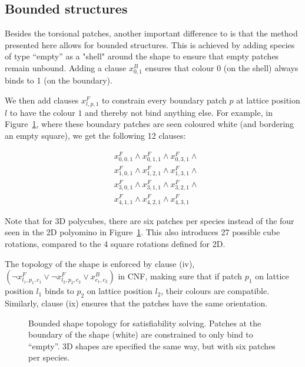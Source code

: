 \subsection{Bounded structures}
Besides the torsional patches, another important difference to \cite{romano2020designing} is that the method presented here allows for bounded structures. This is achieved by adding species of type ``empty'' as a "shell" around the shape to ensure that empty patches remain unbound. Adding a clause \(x_{0,1}^{B}\) ensures that colour 0 (on the shell) always binds to 1 (on the boundary). 

We then add clauses \(x_{l,p,1}^{F}\) to constrain every boundary patch \(p\) at lattice position \(l\) to have the colour \(1\) and thereby not bind anything else. For example, in Figure~\ref{fig:sat_boundary}, where these boundary patches are seen coloured white (and bordering an empty square), we get the following 12 clauses:

\begin{equation}
    \begin{aligned}
        &x_{0,0,1}^{F} \land x_{0,1,1}^{F} \land x_{0,3,1}^{F} \land \\
        &x_{1,0,1}^{F} \land x_{1,2,1}^{F} \land x_{1,3,1}^{F} \land \\
        &x_{3,0,1}^{F} \land x_{3,1,1}^{F} \land x_{3,2,1}^{F} \land \\
        &x_{4,1,1}^{F} \land x_{4,2,1}^{F} \land x_{4,3,1}^{F}
    \end{aligned}
\end{equation}

Note that for 3D polycubes, there are six patches per species instead of the four seen in the 2D polyomino in Figure~\ref{fig:sat_boundary}. This also introduces 27 possible cube rotations, compared to the 4 square rotations defined for 2D.

The topology of the shape is enforced by clause (iv), \(\left(\lnot x_{l_1, p_1, c_1}^{F} \lor \lnot x_{l_2, p_2, c_2}^{F} \lor x_{c_1, c_2}^{B}\right)\) in CNF, making sure that if patch \(p_1\) on lattice position \(l_1\) binds to \(p_2\) on lattice position \(l_2\), their colours are compatible. Similarly, clause (ix) ensures that the patches have the same orientation.


\begin{figure}[ht]
    \centering
    \caption{Bounded shape topology for satisfiability solving. Patches at the boundary of the shape (white) are constrained to only bind to ``empty''. 3D shapes are specified the same way, but with six patches per species.}
    \label{fig:sat_boundary}
\end{figure}

